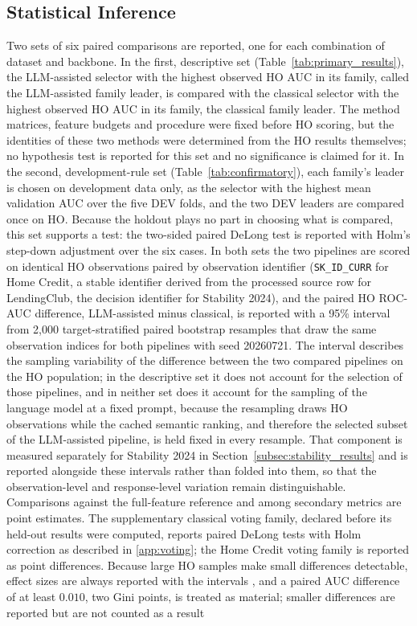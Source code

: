 \documentclass[final,5p,twocolumn]{elsarticle}
\begin{document}
\subsection{Statistical Inference}
\label{subsec:inference}

Two sets of six paired comparisons are reported, one for each combination of dataset and backbone. In the first, descriptive set (Table~\ref{tab:primary_results}), the LLM-assisted selector with the highest observed HO AUC in its family, called the LLM-assisted family leader, is compared with the classical selector with the highest observed HO AUC in its family, the classical family leader. The method matrices, feature budgets and procedure were fixed before HO scoring, but the identities of these two methods were determined from the HO results themselves; no hypothesis test is reported for this set and no significance is claimed for it. In the second, development-rule set (Table~\ref{tab:confirmatory}), each family's leader is chosen on development data only, as the selector with the highest mean validation AUC over the five DEV folds, and the two DEV leaders are compared once on HO. Because the holdout plays no part in choosing what is compared, this set supports a test: the two-sided paired DeLong test \cite{delong1988} is reported with Holm's step-down adjustment \cite{holm1979} over the six cases. In both sets the two pipelines are scored on identical HO observations paired by observation identifier (\texttt{SK\_\allowbreak ID\_\allowbreak CURR} for Home Credit, a stable identifier derived from the processed source row for LendingClub, the decision identifier for Stability 2024), and the paired HO ROC-AUC difference, LLM-assisted minus classical, is reported with a 95\% interval from 2,000 target-stratified paired bootstrap resamples that draw the same observation indices for both pipelines \cite{efron1993} with seed 20260721. The interval describes the sampling variability of the difference between the two compared pipelines on the HO population; in the descriptive set it does not account for the selection of those pipelines, and in neither set does it account for the sampling of the language model at a fixed prompt, because the resampling draws HO observations while the cached semantic ranking, and therefore the selected subset of the LLM-assisted pipeline, is held fixed in every resample. That component is measured separately for Stability 2024 in Section~\ref{subsec:stability_results} and is reported alongside these intervals rather than folded into them, so that the observation-level and response-level variation remain distinguishable. Comparisons against the full-feature reference and among secondary metrics are point estimates. The supplementary classical voting family, declared before its held-out results were computed, reports paired DeLong tests \cite{delong1988} with Holm correction \cite{holm1979} as described in \ref{app:voting}; the Home Credit voting family is reported as point differences. Because large HO samples make small differences detectable, effect sizes are always reported with the intervals \cite{demsar2006}, and a paired AUC difference of at least $0.010$, two Gini points, is treated as material; smaller differences are reported but are not counted as a result 
\end{document}
